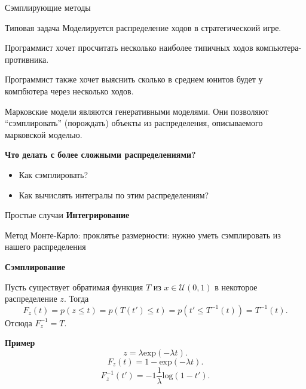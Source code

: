 \begin{frame}{Сэмплирующие методы}


\begin{block}{Типовая задача}
Моделируется распределение ходов в стратегическоий игре.

Программист хочет просчитать несколько наиболее типичных ходов компьютера-противника.

Программист также хочет выяснить сколько в среднем юнитов будет у компбютера через несколько ходов.
\end{block}

Марковские модели являются генеративными моделями. Они позволяют ``сэмплировать'' (порождать) объекты из распределения, описываемого марковской моделью.

\textbf{Что делать с более сложными распределениями?}
\begin{itemize}
\item Как сэмплировать?
\item Как вычислять интегралы по этим распределениям?
\end{itemize}

\end{frame}

\begin{frame}{Простые случаи}
\textbf{Интегрирование}

Метод Монте-Карло: проклятье размерности: нужно уметь сэмплировать из нашего распределения

\textbf{Сэмплирование}

Пусть существует обратимая функция $T$ из $x \in \mathcal{U}(0,1)$ в некоторое распределение $z$.
Тогда \[
F_z(t) = p(z \leq t) = p(T(t') \leq t) = p(t' \leq T^{-1}(t)) = T^{-1}(t).
\]
Отсюда $F_z^{-1} = T$.

\textbf{Пример}
\[
    z = \lambda \text{exp}(-\lambda t).
\]
\[
F_z(t) = 1 - \text{exp}(-\lambda t).
\]
\[
F_z^{-1}(t') = -1\frac{1}{\lambda}\text{log}(1-t').
\] 


\end{frame}




